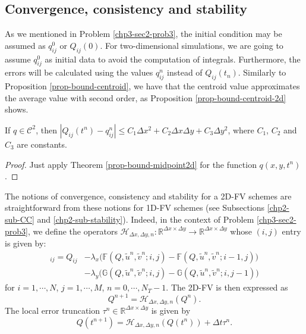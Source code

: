 \subsection{Convergence, consistency and stability}
\label{chp3-CCS}
As we mentioned in Problem \ref{chp3-sec2-prob3}, the initial condition may be assumed as $q_{ij}^0$ or $Q_{ij}(0)$. 
For two-dimensional simulations, we are going to assume  $q_{ij}^0$ as initial data to avoid the computation of integrals.
Furthermore, the errors will be calculated using the values $q_{ij}^n$ instead of $Q_{ij}(t_n)$.
Similarly to Proposition \ref{prop-bound-centroid}, we have that the centroid value approximates the average value
with second order, as Proposition \ref{prop-bound-centroid-2d} shows.
\begin{prop}
	\label{prop-bound-centroid-2d}
	If $q \in \mathcal{C}^2$, then $|Q_{ij}(t^n)-q_{ij}^n| \leq C_1 \Delta x^2 + C_2 \Delta x \Delta y + C_3 \Delta y^2$, where 
	$C_1$, $C_2$ and $C_3$ are constants.
\end{prop}
\begin{proof}
	Just apply Theorem \ref{prop-bound-midpoint2d} for the function $q(x,y,t^n)$.	
\end{proof}
The notions of convergence, consistency and stability for a 2D-FV schemes
are straightforward from these notions for 1D-FV schemes
(see Subsections \ref{chp2-sub-CC} and \ref{chp2-sub-stability}).
Indeed, in the context of Problem \ref{chp3-sec2-prob3}, we define the operators
$\mathcal{H}_{\Delta x ,\Delta y,n}: \mathbb{R}^{\Delta x \times \Delta y} \to \mathbb{R}^{\Delta x \times \Delta y}$ whose $(i,j)$ entry is given by:
\begin{align*}
	[\mathcal{H}_{\Delta x ,\Delta y,n}(Q)]_{ij} = Q_{ij} &-{\lambda_x} \bigg( \mathbb{F}(Q,\tilde{u}^n,\tilde{v}^n;i,j) - \mathbb{F}(Q,\tilde{u}^n,\tilde{v}^n;i-1,j) \bigg) \\ \nonumber
								 	   &-{\lambda_y} \bigg( \mathbb{G}(Q,\tilde{u}^n,\tilde{v}^n;i,j) - \mathbb{G}(Q,\tilde{u}^n,\tilde{v}^n;i,j-1) \bigg)
\end{align*}
for $i=1, \cdots, N$, $j=1, \cdots, M$, $n=0, \cdots, N_T-1$. The 2D-FV is then expressed as
\begin{equation*}
	Q^{n+1} = \mathcal{H}_{\Delta x ,\Delta y,n}(Q^n).
\end{equation*}
The local error truncation $\tau^n \in \mathbb{R}^{\Delta x \times \Delta y}$ is given by
\begin{equation*}
	Q(t^{n+1}) = \mathcal{H}_{\Delta x ,\Delta y,n}(Q(t^n)) + \Delta t \tau^n.
\end{equation*}
